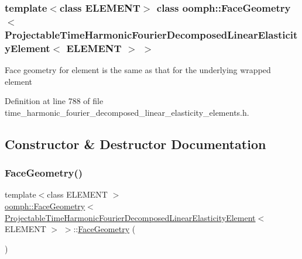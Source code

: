 \subsubsection*{template$<$class E\+L\+E\+M\+E\+NT$>$\newline
class oomph\+::\+Face\+Geometry$<$ Projectable\+Time\+Harmonic\+Fourier\+Decomposed\+Linear\+Elasticity\+Element$<$ E\+L\+E\+M\+E\+N\+T $>$ $>$}

Face geometry for element is the same as that for the underlying wrapped element 

Definition at line 788 of file time\+\_\+harmonic\+\_\+fourier\+\_\+decomposed\+\_\+linear\+\_\+elasticity\+\_\+elements.\+h.



\subsection{Constructor \& Destructor Documentation}
\mbox{\label{classoomph_1_1FaceGeometry_3_01ProjectableTimeHarmonicFourierDecomposedLinearElasticityElement_3_01ELEMENT_01_4_01_4_a85f4d38c887873bbb076933397fc77a2}} 
\subsubsection{\texorpdfstring{Face\+Geometry()}{FaceGeometry()}}
{\footnotesize\ttfamily template$<$class E\+L\+E\+M\+E\+NT $>$ \\
\hyperlink{classoomph_1_1FaceGeometry}{oomph\+::\+Face\+Geometry}$<$ \hyperlink{classoomph_1_1ProjectableTimeHarmonicFourierDecomposedLinearElasticityElement}{Projectable\+Time\+Harmonic\+Fourier\+Decomposed\+Linear\+Elasticity\+Element}$<$ E\+L\+E\+M\+E\+NT $>$ $>$\+::\hyperlink{classoomph_1_1FaceGeometry}{Face\+Geometry} (\begin{DoxyParamCaption}{ }\end{DoxyParamCaption})\hspace{0.3cm}{\ttfamily [inline]}}



